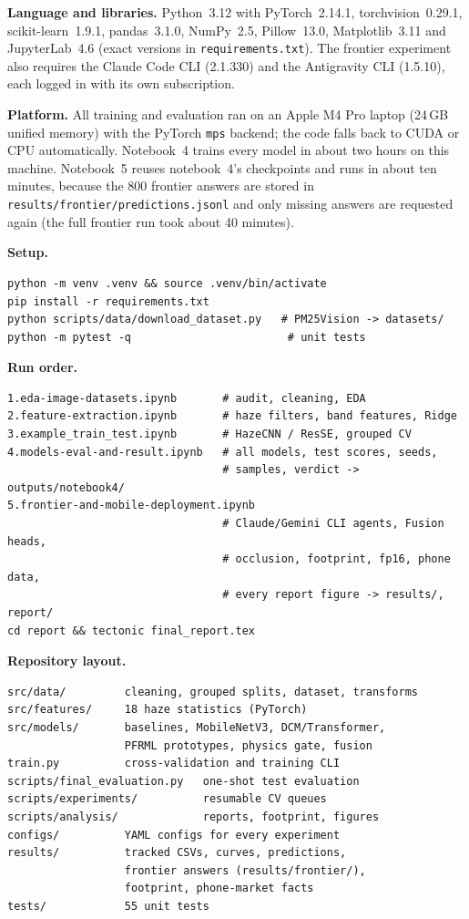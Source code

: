 \documentclass[conference]{IEEEtran}
\begin{document}
\textbf{Language and libraries.} Python~3.12 with PyTorch~2.14.1,
torchvision~0.29.1, scikit-learn~1.9.1, pandas~3.1.0, NumPy~2.5, Pillow~13.0,
Matplotlib~3.11 and JupyterLab~4.6 (exact versions in
\texttt{requirements.txt}). The frontier experiment also requires the
Claude Code CLI (2.1.330) and the Antigravity CLI (1.5.10), each logged in with
its own subscription.

\textbf{Platform.} All training and evaluation ran on an Apple M4 Pro laptop
(24\,GB unified memory) with the PyTorch \texttt{mps} backend; the code falls
back to CUDA or CPU automatically. Notebook~4 trains every model in about two
hours on this machine. Notebook~5 reuses notebook~4's checkpoints and runs in
about ten minutes, because the 800 frontier answers are stored in
\texttt{results/frontier/predictions.jsonl} and only missing answers are
requested again (the full frontier run took about 40 minutes).

\textbf{Setup.}
\begin{lstlisting}
python -m venv .venv && source .venv/bin/activate
pip install -r requirements.txt
python scripts/data/download_dataset.py   # PM25Vision -> datasets/
python -m pytest -q                        # unit tests
\end{lstlisting}

\textbf{Run order.}
\begin{lstlisting}
1.eda-image-datasets.ipynb       # audit, cleaning, EDA
2.feature-extraction.ipynb       # haze filters, band features, Ridge
3.example_train_test.ipynb       # HazeCNN / ResSE, grouped CV
4.models-eval-and-result.ipynb   # all models, test scores, seeds,
                                 # samples, verdict -> outputs/notebook4/
5.frontier-and-mobile-deployment.ipynb
                                 # Claude/Gemini CLI agents, Fusion heads,
                                 # occlusion, footprint, fp16, phone data,
                                 # every report figure -> results/, report/
cd report && tectonic final_report.tex
\end{lstlisting}

\textbf{Repository layout.}
\begin{lstlisting}
src/data/         cleaning, grouped splits, dataset, transforms
src/features/     18 haze statistics (PyTorch)
src/models/       baselines, MobileNetV3, DCM/Transformer,
                  PFRML prototypes, physics gate, fusion
train.py          cross-validation and training CLI
scripts/final_evaluation.py   one-shot test evaluation
scripts/experiments/          resumable CV queues
scripts/analysis/             reports, footprint, figures
configs/          YAML configs for every experiment
results/          tracked CSVs, curves, predictions,
                  frontier answers (results/frontier/),
                  footprint, phone-market facts
tests/            55 unit tests
\end{lstlisting}
\end{document}
